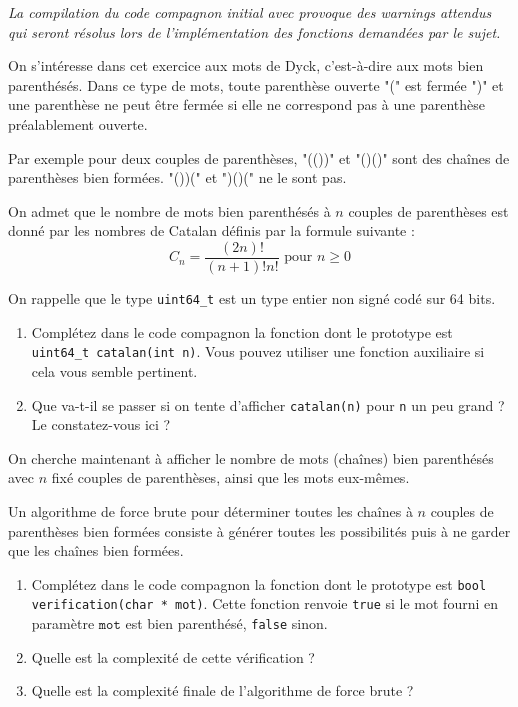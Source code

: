 \documentclass{ccinp}
\begin{document}
  \newpage



\preambulec

\textit{La compilation du code compagnon initial avec  provoque des warnings attendus qui seront résolus lors de l'implémentation des fonctions demandées par le sujet.}

On s'intéresse dans cet exercice aux mots de Dyck, c'est-à-dire aux mots bien parenthésés.
Dans ce type de mots, toute parenthèse ouverte "(" est fermée ")" et 
une parenthèse ne peut être fermée si elle ne correspond pas à une parenthèse préalablement ouverte.

Par exemple pour deux couples de parenthèses, "(())" et "()()" sont des chaînes de parenthèses bien formées. 
"())(" et ")()(" ne le sont pas.

On admet que le nombre de mots bien parenthésés à $n$ couples de parenthèses est donné par les nombres de Catalan définis par la formule suivante :
$$C_n = \frac{(2n)!}{(n+1)!n!} \text{ pour } n\geq 0$$

On rappelle que le type \texttt{uint64\_t} est un type entier non signé codé sur 64 bits.

\begin{enumerate}
\item Complétez dans le code compagnon la fonction dont le prototype est \texttt{uint64\_t catalan(int n)}.
Vous pouvez utiliser une fonction auxiliaire si cela vous semble pertinent.
\item Que va-t-il se passer si on tente d’afficher \texttt{catalan(n)} pour \texttt{n} un peu grand ? Le constatez-vous ici ?
\end{enumerate}

On cherche maintenant à afficher le nombre de mots (chaînes) bien parenthésés avec $n$ fixé couples de parenthèses, ainsi que les mots eux-mêmes.

Un algorithme de force brute pour déterminer toutes les chaînes à $n$ couples de parenthèses bien formées 
consiste à générer toutes les possibilités puis à ne garder que les chaînes bien formées.

\begin{enumerate}
\addtocounter{enumi}{2}
\item Complétez dans le code compagnon la fonction dont le prototype est \texttt{bool verification(char * mot)}. Cette fonction renvoie \texttt{true} si le mot fourni en paramètre $\texttt{mot}$ est bien parenthésé, \texttt{false} sinon.
\item Quelle est la complexité de cette vérification ?
\item Quelle est la complexité finale de l'algorithme de force brute ?
\end{enumerate}
\end{document}
